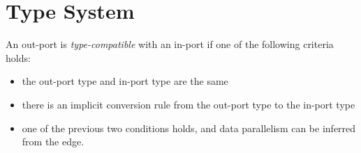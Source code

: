 
\chapter{Type System} \label{sec:TypeSystem}

An out-port is \emph{type-compatible} with an in-port if one of the following criteria holds:
\begin{itemize}
	\item the out-port type and in-port type are the same
	\item there is an implicit conversion rule from the out-port type to the in-port type
	\item one of the previous two conditions holds, and data parallelism can be inferred from the edge.
\end{itemize}

